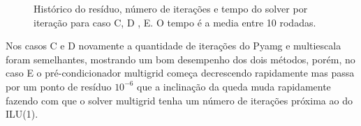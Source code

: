 \begin{figure}[]
\center
{}


\qquad
{}

\caption{ Histórico do resíduo, número de iterações e tempo do solver por iteração para caso C, D , E. O tempo é a media entre 10 rodadas. }

\label{fig:resultadosCDE}
\end{figure}

Nos casos C e D novamente a quantidade de iterações do Pyamg e multiescala foram semelhantes, mostrando um bom desempenho dos dois métodos, porém, no caso E o pré-condicionador multigrid começa decrescendo rapidamente mas passa por um ponto de resíduo $10^{-6}$ que a inclinação da queda muda rapidamente fazendo com que o solver multigrid tenha um número de iterações próxima ao do ILU(1). 


